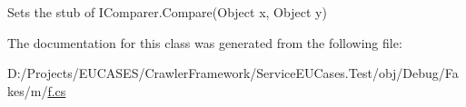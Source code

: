 Sets the stub of I\-Comparer.\-Compare(\-Object x, Object y)



The documentation for this class was generated from the following file\-:\begin{DoxyCompactItemize}
\item 
D\-:/\-Projects/\-E\-U\-C\-A\-S\-E\-S/\-Crawler\-Framework/\-Service\-E\-U\-Cases.\-Test/obj/\-Debug/\-Fakes/m/\hyperlink{m_2f_8cs}{f.\-cs}\end{DoxyCompactItemize}

